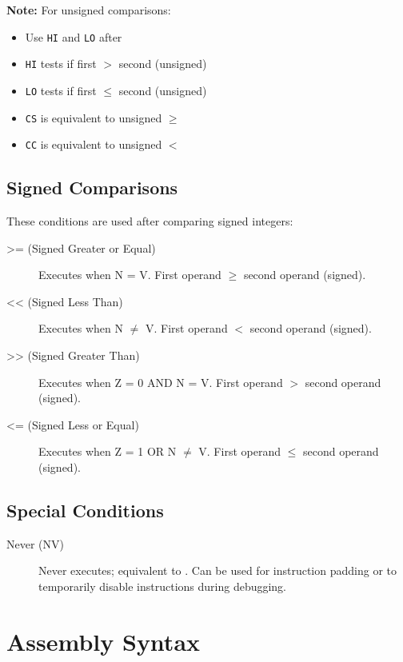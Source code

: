 \textbf{Note:} For unsigned comparisons:
\begin{itemize}
	\item Use \texttt{HI} and \texttt{LO} after 
	\item \texttt{HI} tests if first $>$ second (unsigned)
	\item \texttt{LO} tests if first $\leq$ second (unsigned)
	\item \texttt{CS} is equivalent to unsigned $\geq$
	\item \texttt{CC} is equivalent to unsigned $<$
\end{itemize}

\subsection{Signed Comparisons}

These conditions are used after comparing signed integers:

\begin{description}
	\item[>= (Signed Greater or Equal)] Executes when N = V. First operand $\geq$ second operand (signed).

	\item[<< (Signed Less Than)] Executes when N $\neq$ V. First operand $<$ second operand (signed).

	\item[>> (Signed Greater Than)] Executes when Z = 0 AND N = V. First operand $>$ second operand (signed).

	\item[<= (Signed Less or Equal)] Executes when Z = 1 OR N $\neq$ V. First operand $\leq$ second operand (signed).
\end{description}

\subsection{Special Conditions}

\begin{description}
	\item[Never (NV)] Never executes; equivalent to . Can be used for instruction padding or to temporarily
	      disable instructions during debugging.
\end{description}

\section{Assembly Syntax}

